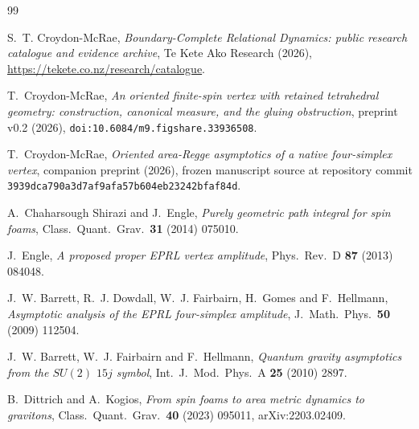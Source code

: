 \documentclass[11pt]{article}
\numberwithin{equation}{section}
\begin{document}
\enlargethispage{3\baselineskip}
\begin{thebibliography}{99}

S.~T. Croydon-McRae,
\emph{Boundary-Complete Relational Dynamics: public research catalogue and evidence archive},
Te Kete Ako Research (2026),
\url{https://tekete.co.nz/research/catalogue}.

T.~Croydon-McRae,
\emph{An oriented finite-spin vertex with retained tetrahedral geometry:
construction, canonical measure, and the gluing obstruction},
preprint v0.2 (2026), \texttt{doi:10.6084/m9.figshare.33936508}.

T.~Croydon-McRae,
\emph{Oriented area-Regge asymptotics of a native four-simplex vertex},
companion preprint (2026), frozen manuscript source at repository commit
\texttt{3939dca790a3d7af9afa57b604eb23242bfaf84d}.

A.~Chaharsough Shirazi and J.~Engle,
\emph{Purely geometric path integral for spin foams},
Class.\ Quant.\ Grav.\ \textbf{31} (2014) 075010.

J.~Engle,
\emph{A proposed proper EPRL vertex amplitude},
Phys.\ Rev.\ D \textbf{87} (2013) 084048.

J.~W. Barrett, R.~J. Dowdall, W.~J. Fairbairn, H.~Gomes and F.~Hellmann,
\emph{Asymptotic analysis of the EPRL four-simplex amplitude},
J.\ Math.\ Phys.\ \textbf{50} (2009) 112504.

J.~W. Barrett, W.~J. Fairbairn and F.~Hellmann,
\emph{Quantum gravity asymptotics from the $SU(2)$ $15j$ symbol},
Int.\ J.\ Mod.\ Phys.\ A \textbf{25} (2010) 2897.

B.~Dittrich and A.~Kogios,
\emph{From spin foams to area metric dynamics to gravitons},
Class.\ Quant.\ Grav.\ \textbf{40} (2023) 095011, arXiv:2203.02409.

\end{thebibliography}
\end{document}
